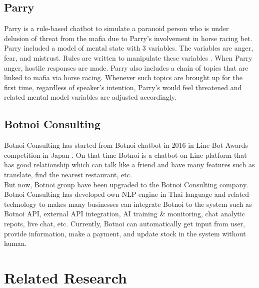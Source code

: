 \documentclass[12pt,oneside,openright,a4paper]{cpe-english-project}
\begin{document}
\subsection{Parry}
Parry is a rule-based chatbot to simulate a paranoid person who is under delusion of threat
from the mafia due to Parry’s involvement in horse racing bet. Parry included a model of mental
state with 3 variables. The variables are anger, fear, and mistrust. Rules are written to
manipulate these variables \cite{parry_met_eliza}
. When Parry anger, hostile responses are made. Parry also includes a chain of topics that are
linked to mafia via horse racing. Whenever such topics are brought up for the first time,
regardless of speaker’s intention, Parry’s would feel threatened and related mental model
variables are adjusted accordingly.

\subsection{Botnoi Consulting}
Botnoi Consulting has started from Botnoi chatbot in 2016 in Line Bot Awards competition in Japan \cite{botnoi_enterprise_chatbot}.
On that time Botnoi is a chatbot on Line platform that has good relationship which can talk like
a friend and have many features such as translate, find the nearest restaurant, etc.\\
But now, Botnoi group have been upgraded to the Botnoi Consulting company. Botnoi Consulting
has developed own NLP engine in Thai language and related technology to makes many businesses
can integrate Botnoi to the system such as Botnoi API, external API integration, AI training
\& monitoring, chat analytic repots, live chat, etc. Currently, Botnoi can automatically get
input from user, provide information, make a payment, and update stock in the system without human.

\section{Related Research}
\end{document}
